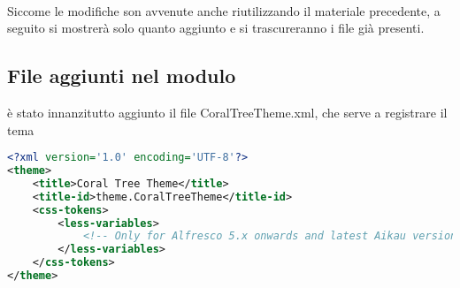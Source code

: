 \paragraph{} Siccome le modifiche son avvenute anche riutilizzando il materiale precedente, a seguito si mostrerà solo quanto aggiunto e si trascureranno i file già presenti.
\subsection{File aggiunti nel modulo}
è stato innanzitutto aggiunto il file CoralTreeTheme.xml, che serve a registrare il tema
\begin{lstlisting}[language=XML]
<?xml version='1.0' encoding='UTF-8'?>
<theme>
    <title>Coral Tree Theme</title>
    <title-id>theme.CoralTreeTheme</title-id>
    <css-tokens>
        <less-variables>
            <!-- Only for Alfresco 5.x onwards and latest Aikau version -->
        </less-variables>
    </css-tokens>
</theme>
\end{lstlisting}
